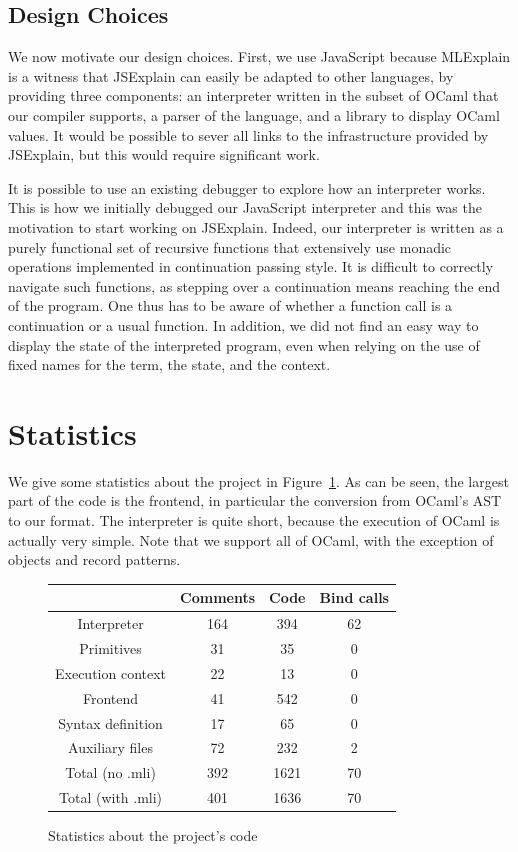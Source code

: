 \documentclass[twocolumn,a4paper]{article}
\begin{document}
\subsection{Design Choices}\label{subsec:design}

We now motivate our design choices. First, we use JavaScript because MLExplain
is a witness that JSExplain can easily be adapted to other languages, by
providing three components: an interpreter written in the subset of OCaml that
our compiler supports, a parser of the language, and a library to display OCaml
values. It would be possible to sever all links to the infrastructure provided
by JSExplain, but this would require significant work.

It is possible to use an existing debugger to explore how an interpreter works.
This is how we initially debugged our JavaScript interpreter and this was the
motivation to start working on JSExplain. Indeed, our interpreter is written as
a purely functional set of recursive functions that extensively use monadic
operations implemented in continuation passing style. It is difficult to
correctly navigate such functions, as stepping over a continuation means
reaching the end of the program. One thus has to be aware of whether a function
call is a continuation or a usual function. In addition, we did not find an easy
way to display the state of the interpreted program, even when relying on the
use of fixed names for the term, the state, and the context.

\section{Statistics}

We give some statistics about the project in Figure~\ref{fig:statistics}. As can
be seen, the largest part of the code is the frontend, in particular the
conversion from OCaml's AST to our format. The interpreter is quite short,
because the execution of OCaml is actually very simple. Note that we support all
of OCaml, with the exception of objects and record patterns.

\begin{figure}
  \begin{tabular}{| c | c | c | c |}
    \hline
    & Comments & Code & Bind calls \\
    \hline
    Interpreter & 164 & 394 & 62 \\
    Primitives & 31 & 35 & 0 \\
    Execution context & 22 & 13 & 0 \\
    Frontend & 41 & 542 & 0 \\
    Syntax definition & 17 & 65 & 0 \\
    Auxiliary files & 72 & 232 & 2 \\
    \hline
    Total (no .mli) & 392 & 1621 & 70 \\
    Total (with .mli) & 401 & 1636 & 70 \\
    \hline
  \end{tabular}

  \centering
  \caption{Statistics about the project's code}
  \label{fig:statistics}
\end{figure}
\end{document}
